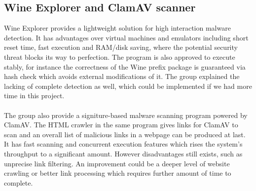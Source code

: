 \subsection{Wine Explorer and ClamAV scanner}
Wine Explorer provides a lightweight solution for high interaction malware 
detection. It has advantages over virtual machines and emulators including 
short reset time, fast execution and RAM/disk saving, where the potential 
security threat blocks its way to perfection. The program is also approved to 
execute stably, for instance the correctness of the Wine prefix package is 
guaranteed via hash check which avoids external modifications of it. The group 
explained the lacking of complete detection as well, which could be 
implemented if we had more time in this project. 
\paragraph{}
The group also provide a signiture-based malware scanning program powered by ClamAV. 
The 
HTML crawler in the same program gives links for ClamAV to scan and an 
overall list of malicious links in a webpage can be produced at last. 
It has fast scanning and concurrent execution features which rises 
the system's throughput to a significant amount. However disadvantages still 
exists, 
such as unprecise link filtering. An improvement could be a deeper level of 
website crawling or better link processing which requires further amount 
of time to complete. 
